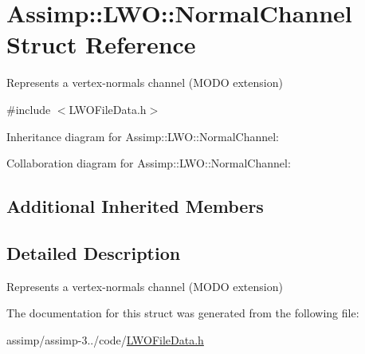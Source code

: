 \hypertarget{struct_assimp_1_1_l_w_o_1_1_normal_channel}{\section{Assimp\+:\+:L\+W\+O\+:\+:Normal\+Channel Struct Reference}
\label{struct_assimp_1_1_l_w_o_1_1_normal_channel}
}


Represents a vertex-\/normals channel (M\+O\+D\+O extension)  




{\ttfamily \#include $<$L\+W\+O\+File\+Data.\+h$>$}



Inheritance diagram for Assimp\+:\+:L\+W\+O\+:\+:Normal\+Channel\+:


Collaboration diagram for Assimp\+:\+:L\+W\+O\+:\+:Normal\+Channel\+:
\subsection*{Additional Inherited Members}


\subsection{Detailed Description}
Represents a vertex-\/normals channel (M\+O\+D\+O extension) 

The documentation for this struct was generated from the following file\+:\begin{DoxyCompactItemize}
\item 
assimp/assimp-\/3../code/\hyperlink{_l_w_o_file_data_8h}{L\+W\+O\+File\+Data.\+h}\end{DoxyCompactItemize}
